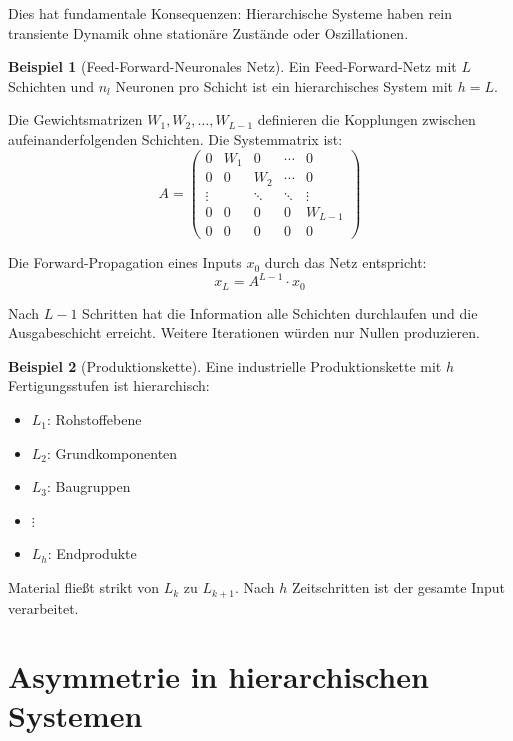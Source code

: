 \documentclass[a4paper,12pt]{report}
\theoremstyle{definition}
\newtheorem{beispiel}{Beispiel}
\begin{document}
	Dies hat fundamentale Konsequenzen: Hierarchische Systeme haben rein transiente Dynamik ohne stationäre Zustände oder Oszillationen.
	
	\begin{beispiel}[Feed-Forward-Neuronales Netz]
		Ein Feed-Forward-Netz mit $L$ Schichten und $n_l$ Neuronen pro Schicht ist ein hierarchisches System mit $h = L$.
		
		Die Gewichtsmatrizen $W_1, W_2, \ldots, W_{L-1}$ definieren die Kopplungen zwischen aufeinanderfolgenden Schichten. Die Systemmatrix ist:
		\[
		A = \begin{pmatrix}
			0 & W_1 & 0 & \cdots & 0 \\
			0 & 0 & W_2 & \cdots & 0 \\
			\vdots & & \ddots & \ddots & \vdots \\
			0 & 0 & 0 & 0 & W_{L-1} \\
			0 & 0 & 0 & 0 & 0
		\end{pmatrix}
		\]
		
		Die Forward-Propagation eines Inputs $x_0$ durch das Netz entspricht:
		\[
		x_L = A^{L-1} \cdot x_0
		\]
		
		Nach $L-1$ Schritten hat die Information alle Schichten durchlaufen und die Ausgabeschicht erreicht. Weitere Iterationen würden nur Nullen produzieren.
	\end{beispiel}
	
	\begin{beispiel}[Produktionskette]
		Eine industrielle Produktionskette mit $h$ Fertigungsstufen ist hierarchisch:
		\begin{itemize}
			\item $L_1$: Rohstoffebene
			\item $L_2$: Grundkomponenten
			\item $L_3$: Baugruppen
			\item $\vdots$
			\item $L_h$: Endprodukte
		\end{itemize}
		
		Material fließt strikt von $L_k$ zu $L_{k+1}$. Nach $h$ Zeitschritten ist der gesamte Input verarbeitet.
	\end{beispiel}
	
	\section{Asymmetrie in hierarchischen Systemen}
	
\end{document}
